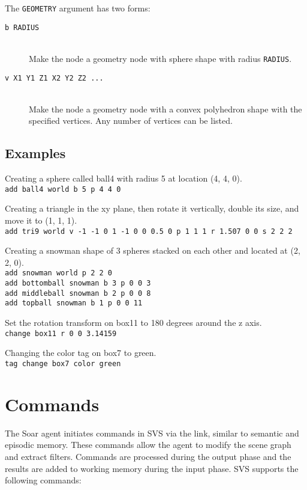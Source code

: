 The \texttt{GEOMETRY} argument has two forms:

\begin{description}

\item[\texttt{b RADIUS}] \hfill \\
Make the node a geometry node with sphere shape with radius \texttt{RADIUS}.

\item[\texttt{v X1 Y1 Z1 X2 Y2 Z2 ...}] \hfill \\
Make the node a geometry node with a convex polyhedron shape with the specified vertices.
Any number of vertices can be listed.

\end{description}

\subsection{Examples}

Creating a sphere called ball4 with radius 5 at location (4, 4, 0). \\
\texttt{add ball4 world b 5 p 4 4 0}

Creating a triangle in the xy plane, then rotate it vertically, double its size, and move it to (1, 1, 1).  \\
\texttt{add tri9 world v -1 -1 0 1 -1 0 0 0.5 0 p 1 1 1 r 1.507 0 0 s 2 2 2}

Creating a snowman shape of 3 spheres stacked on each other and located at (2, 2, 0). \\
\texttt{add snowman world p 2 2 0} \\
\texttt{add bottomball snowman b 3 p 0 0 3} \\
\texttt{add middleball snowman b 2 p 0 0 8} \\
\texttt{add topball snowman b 1 p 0 0 11} 

Set the rotation transform on box11 to 180 degrees around the z axis. \\
\texttt{change box11 r 0 0 3.14159}

Changing the color tag on box7 to green. \\
\texttt{tag change box7 color green}


\section{Commands}

The Soar agent initiates commands in SVS via the  link, 
similar to semantic and episodic memory. These commands allow the agent to 
modify the scene graph and extract filters. 
Commands are processed during the output phase and the results are added to 
working memory during the input phase. 
SVS supports the following commands:


